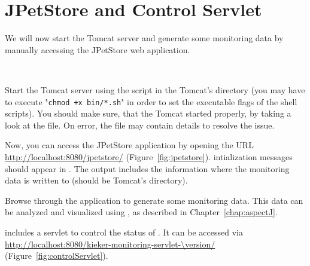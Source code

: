 \section{JPetStore and \KiekerMonitoringPart{} Control Servlet}

\noindent We will now start the Tomcat server and generate some monitoring data by manually %
accessing the JPetStore web application. 

\

\begin{compactenum}
\item Start the Tomcat server using the  script in the 
   Tomcat's  directory (you may have to execute "\texttt{chmod +x bin/*.sh}" %
   in order to set the executable flags of the shell scripts). %
   You should make sure, that the Tomcat started properly, by taking 
   a look at the  file. %
   On error, the file  may contain details %
   to resolve the issue.
\item Now, you can access the JPetStore application by opening the URL
   \url{http://localhost:8080/jpetstore/} (Figure~\ref{fig:jpetstore}). %
   \Kieker{} intialization messages should appear in . %
   The output includes the information where the monitoring data is written to
   (should be Tomcat's  directory).
\item  Browse through the application to generate some monitoring data. %
   This data can be analyzed and visualized using \KiekerTraceAnalysis{}, %
   as described in Chapter~\ref{chap:aspectJ}.
\item \Kieker{} includes a servlet to control the status of \KiekerMonitoringPart{}. %
   It can be accessed via \url{http://localhost:8080/kieker-monitoring-servlet-\version/} %
   (Figure~\ref{fig:controlServlet}).
\end{compactenum}

